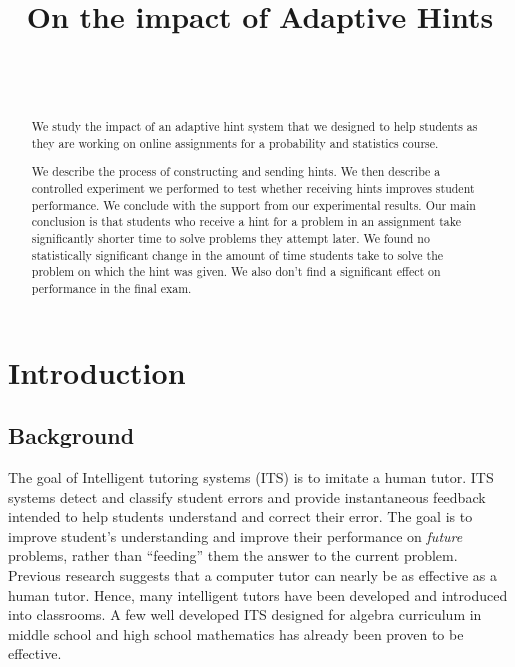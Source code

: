 \documentclass{sigchi}
\title{On the impact of Adaptive Hints}
\author{
  \alignauthor{Zhen Zhai\\
    \affaddr{UC San Diego}\\
    \email{zzhai@eng.ucsd.edu}}\\
  \alignauthor{Yoav Freund\\
    \affaddr{UC San Diego}\\
    \email{yfreund@eng.ucsd.edu}}\\
}
\begin{document}
\maketitle

\begin{abstract}

We study the impact of an adaptive hint system that we designed to help students as they are working on online assignments for a probability and statistics course.

We describe the process of constructing and sending hints. We then describe a controlled experiment we performed to test whether receiving hints improves student performance. We conclude with the support from our experimental results. Our main conclusion is that students who receive a hint for a problem in an assignment take significantly shorter time to solve problems they attempt later. We found no statistically significant change in the amount of time students take to solve the problem on which the hint was given. We also don't find a significant effect on performance in the final exam.

\end{abstract}



\section{Introduction}



\subsection*{Background}
The goal of Intelligent tutoring systems (ITS)\cite{Anderson1995} is to imitate a human tutor.  ITS systems detect and classify student errors and provide instantaneous feedback intended to help students
understand and correct their error. The goal is to improve
student's understanding and improve their performance on {\em future} problems, rather than ``feeding'' them the answer to the current problem.  Previous research suggests that a computer tutor can nearly be as effective as a human tutor\cite{Vanlehn2011}. Hence, many intelligent tutors have been developed and introduced into classrooms. A few well developed ITS designed for algebra curriculum in middle school and high school mathematics has already been proven
to be effective\cite{Koedinger1997, John2014}.
\end{document}
